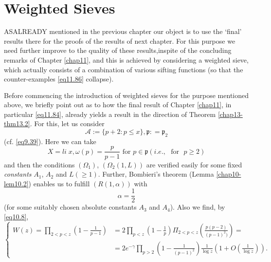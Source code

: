 
\chapter{Weighted Sieves}\label{chap12}%

AS\pageoriginale ALREADY mentioned in the previous chapter our object
is to use the 
`final' results  there for  the proofs  
 of the results of next  chapter. For this purpose we need further
 improve to the quality  of these results,inspite of the concluding
 remarks of Chapter \ref{chap11}, and this is achie\-ved by considering a
 weighted sieve, which actually consists of a combination of various
 sifting functions (so that the counter-examples \eqref{eq11.86} collapse). 
 
 Before commencing the introduction of weighted  sieves for the
 purpose mentioned above, we briefly point out as to how the final
 result of Chapter \ref{chap11}, in particular \eqref{eq11.84},
 already yields a result in the direction of Theorem  
 \ref{chap13-thm13.2}. For this, let us consider
  \begin{equation*}
 \mathscr{A} := \bigg\{ p+2: p \leq x \bigg\}, \mathfrak{p} : =
 \mathfrak{p}_2 \tag{12.1}\label{eq12.1} 
 \end{equation*} 
(cf. \eqref{eq9.39}). Here we can take
\begin{equation*}
X=li \; x, \omega(p) = \frac{p}{p-1} \text{ for } p \in \mathfrak{p}
(i.e., \text{~ for~ } p\ge 2) \tag{12.2}\label{eq12.2} 
\end{equation*}  
and then the conditions $(\Omega_1)$, $(\Omega_2(1,L))$ are verified
easily for some fixed \textit{constants} $A_1$, $A_2$ and $L(\ge
1)$. Further, Bombieri's theorem (Lemma \ref{chap10-lem10.2}) enables
us to fulfill $(R(1, \alpha))$ with 
\begin{equation*}
\alpha = \frac{1}{2} \tag{12.3}\label{eq12.3}
\end{equation*}  
(for some suitably chosen absolute constants $A_3$ and $A_4$). 
  Also we find, by \eqref{eq10.8}, 
\begin{equation*}
\begin{cases}
W(z)= \prod\limits_{2<p<z} (1-\frac{1}{p-1})&=2
\prod\limits_{p<z}(1-\frac{1}{p}) \Pi _{2<p<z}
(\frac{p(p-2)}{(p-1)^2)})= \\ 
 & = 2e^{-\gamma}\prod\limits_{p>2}(1-\frac{1}{(p-1)^2})\frac{1}{\log
  z}(1+O(\frac{1}{\log z})).  
\end{cases}\tag{12.4}\label{eq12.4} 
\end{equation*}
  
